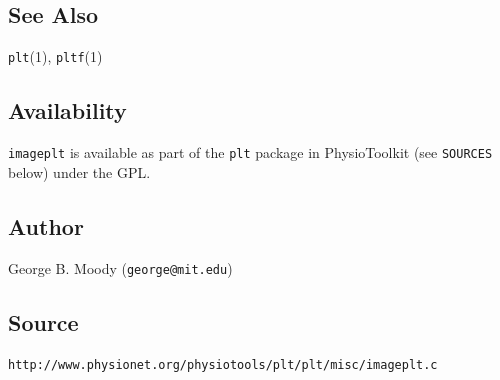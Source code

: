 \subsection*{See Also}


\textsf{\texttt{plt}(1)},
\textsf{\texttt{pltf}(1)} 
\subsection*{Availability}
\texttt{imageplt} is available as part of the \texttt{plt} package in
PhysioToolkit (see \texttt{SOURCES} below) under the GPL. 
\subsection*{Author}
George B. Moody (\texttt{george@mit.edu})

\subsection*{Source}
\texttt{http://www.physionet.org/physiotools/plt/plt/misc/imageplt.c} 
\
